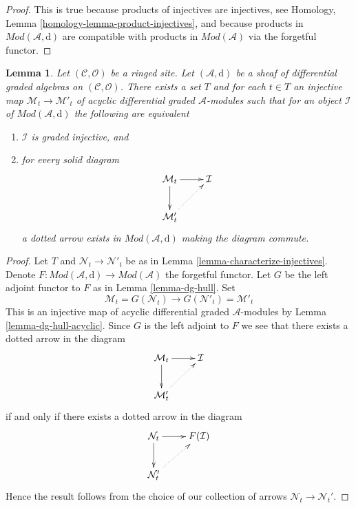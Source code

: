 \documentclass{stacks-project}
\theoremstyle{plain}
\newtheorem{lemma}[subsection]{Lemma}
\theoremstyle{definition}
\theoremstyle{remark}
\numberwithin{equation}{subsection}
\begin{document}
\begin{proof}
This is true because products of injectives are injectives, see
Homology, Lemma \ref{homology-lemma-product-injectives}, and
because products in
$\textit{Mod}(\mathcal{A}, \text{d})$ are compatible with
products in $\textit{Mod}(\mathcal{A})$ via the forgetful functor.
\end{proof}

\begin{lemma}
\label{lemma-characterize-graded-injectives-in-dg}
Let $(\mathcal{C}, \mathcal{O})$ be a ringed site.
Let $(\mathcal{A}, \text{d})$
be a sheaf of differential graded algebras on $(\mathcal{C}, \mathcal{O})$.
There exists a set $T$ and for each $t \in T$ an injective map
$\mathcal{M}_t \to \mathcal{M}'_t$ of
acyclic differential graded $\mathcal{A}$-modules
such that for an object $\mathcal{I}$ of $\textit{Mod}(\mathcal{A}, \text{d})$
the following are equivalent
\begin{enumerate}
\item $\mathcal{I}$ is graded injective, and
\item for every solid diagram
$$
\xymatrix{
\mathcal{M}_t \ar[r] \ar[d] & \mathcal{I} \\
\mathcal{M}'_t \ar@{..>}[ru]
}
$$
a dotted arrow exists in $\textit{Mod}(\mathcal{A}, \text{d})$
making the diagram commute.
\end{enumerate}
\end{lemma}

\begin{proof}
Let $T$ and $\mathcal{N}_t \to \mathcal{N}'_t$ be as in
Lemma \ref{lemma-characterize-injectives}.
Denote $F : \textit{Mod}(\mathcal{A}, \text{d}) \to \textit{Mod}(\mathcal{A})$
the forgetful functor.
Let $G$ be the left adjoint functor to
$F$ as in Lemma \ref{lemma-dg-hull}. Set
$$
\mathcal{M}_t = G(\mathcal{N}_t) \to
G(\mathcal{N}'_t) = \mathcal{M}'_t
$$
This is an injective map of acyclic differential graded
$\mathcal{A}$-modules by Lemma \ref{lemma-dg-hull-acyclic}.
Since $G$ is the left adjoint to $F$ we see that
there exists a dotted arrow in the diagram
$$
\xymatrix{
\mathcal{M}_t \ar[r] \ar[d] & \mathcal{I} \\
\mathcal{M}'_t \ar@{..>}[ru]
}
$$
if and only if there exists a dotted arrow in the diagram
$$
\xymatrix{
\mathcal{N}_t \ar[r] \ar[d] & F(\mathcal{I}) \\
\mathcal{N}'_t \ar@{..>}[ru]
}
$$
Hence the result follows from the choice of our
collection of arrows $\mathcal{N}_t \to \mathcal{N}_t'$.
\end{proof}
\end{document}
